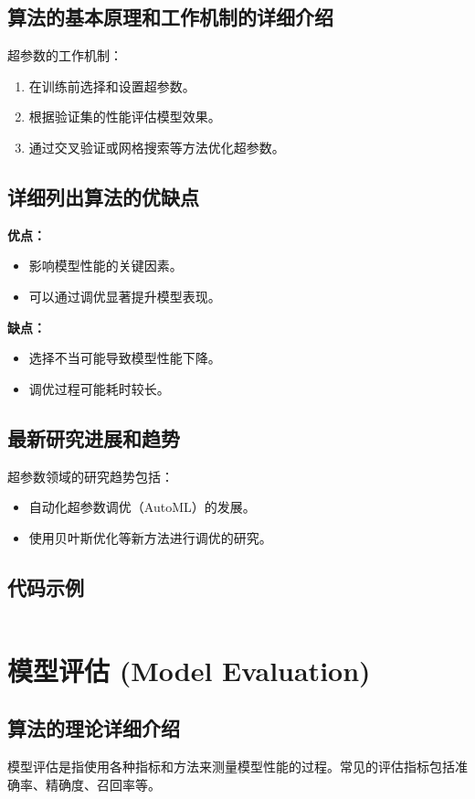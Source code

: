 \subsection*{算法的基本原理和工作机制的详细介绍}
超参数的工作机制：
\begin{enumerate}
    \item 在训练前选择和设置超参数。
    \item 根据验证集的性能评估模型效果。
    \item 通过交叉验证或网格搜索等方法优化超参数。
\end{enumerate}

\subsection*{详细列出算法的优缺点}
\textbf{优点：}
\begin{itemize}
    \item 影响模型性能的关键因素。
    \item 可以通过调优显著提升模型表现。
\end{itemize}

\textbf{缺点：}
\begin{itemize}
    \item 选择不当可能导致模型性能下降。
    \item 调优过程可能耗时较长。
\end{itemize}

\subsection*{最新研究进展和趋势}
超参数领域的研究趋势包括：
\begin{itemize}
    \item 自动化超参数调优（AutoML）的发展。
    \item 使用贝叶斯优化等新方法进行调优的研究。
\end{itemize}
\subsection*{代码示例}
\begin{lstlisting}

\end{lstlisting}


\section{模型评估 (Model Evaluation)}
\subsection*{算法的理论详细介绍}
模型评估是指使用各种指标和方法来测量模型性能的过程。常见的评估指标包括准确率、精确度、召回率等。

